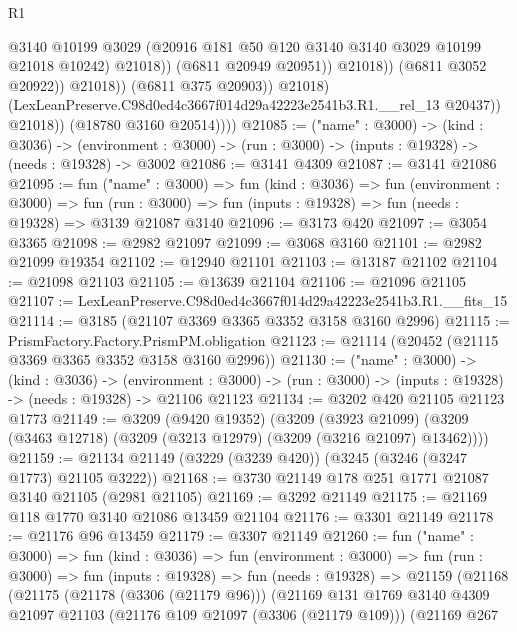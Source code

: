 \begin{lexlean}{R1}
\begin{coremodule}
                                    @3140
                                    @10199
                                    @3029
                                    (@20916 @181 @50 @120 @3140 @3140 @3029 @10199 @21018 @10242)
                                    @21018))
                                (@6811 @20949 @20951))
                              @21018))
                          (@6811 @3052 @20922))
                        @21018))
                    (@6811 @375 @20903))
                  @21018)
                (LexLeanPreserve.C98d0ed4c3667f014d29a42223e2541b3.R1.__rel_13 @20437))
              @21018))
          (@18780 @3160 @20514))))
@21085 := ("name" : @3000) ->
  (kind : @3036) ->
  (environment : @3000) -> (run : @3000) -> (inputs : @19328) -> (needs : @19328) -> @3002
@21086 := @3141 @4309
@21087 := @3141 @21086
@21095 := fun ("name" : @3000) =>
  fun (kind : @3036) =>
  fun (environment : @3000) =>
  fun (run : @3000) => fun (inputs : @19328) => fun (needs : @19328) => @3139 @21087 @3140
@21096 := @3173 @420
@21097 := @3054 @3365
@21098 := @2982 @21097
@21099 := @3068 @3160
@21101 := @2982 @21099 @19354
@21102 := @12940 @21101
@21103 := @13187 @21102
@21104 := @21098 @21103
@21105 := @13639 @21104
@21106 := @21096 @21105
@21107 := LexLeanPreserve.C98d0ed4c3667f014d29a42223e2541b3.R1.__fits_15
@21114 := @3185 (@21107 @3369 @3365 @3352 @3158 @3160 @2996)
@21115 := PrismFactory.Factory.PrismPM.obligation
@21123 := @21114 (@20452 (@21115 @3369 @3365 @3352 @3158 @3160 @2996))
@21130 := ("name" : @3000) ->
  (kind : @3036) ->
  (environment : @3000) -> (run : @3000) -> (inputs : @19328) -> (needs : @19328) -> @21106 @21123
@21134 := @3202 @420 @21105 @21123 @1773
@21149 := @3209
    (@9420 @19352)
    (@3209
      (@3923 @21099)
      (@3209 (@3463 @12718) (@3209 (@3213 @12979) (@3209 (@3216 @21097) @13462))))
@21159 := @21134 @21149 (@3229 (@3239 @420)) (@3245 (@3246 (@3247 @1773) @21105 @3222))
@21168 := @3730 @21149 @178 @251 @1771 @21087 @3140 @21105 (@2981 @21105)
@21169 := @3292 @21149
@21175 := @21169 @118 @1770 @3140 @21086 @13459 @21104
@21176 := @3301 @21149
@21178 := @21176 @96 @13459
@21179 := @3307 @21149
@21260 := fun ("name" : @3000) =>
  fun (kind : @3036) =>
  fun (environment : @3000) =>
  fun (run : @3000) =>
  fun (inputs : @19328) =>
  fun (needs : @19328) =>
  @21159
    (@21168
      (@21175
        (@21178 (@3306 (@21179 @96)))
        (@21169
          @131
          @1769
          @3140
          @4309
          @21097
          @21103
          (@21176 @109 @21097 (@3306 (@21179 @109)))
          (@21169
            @267

\end{coremodule}
\end{lexlean}
